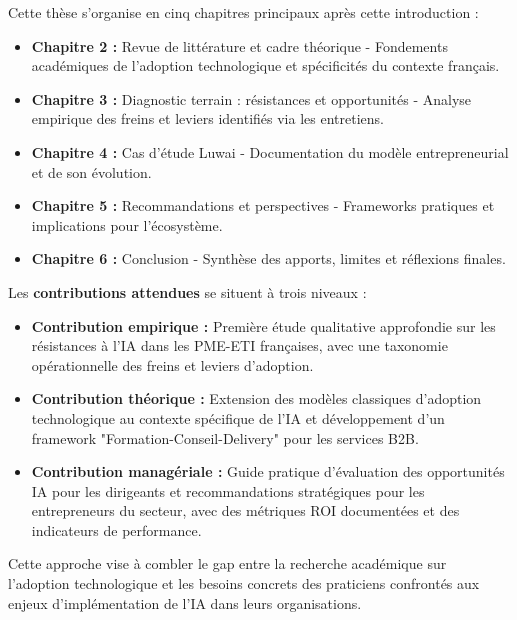 Cette thèse s'organise en cinq chapitres principaux après cette introduction :
\bigskip
\begin{itemize}
    \item \textbf{Chapitre 2 :} Revue de littérature et cadre théorique - Fondements académiques de l'adoption technologique et spécificités du contexte français.
    \item \textbf{Chapitre 3 :} Diagnostic terrain : résistances et opportunités - Analyse empirique des freins et leviers identifiés via les entretiens.
    \item \textbf{Chapitre 4 :} Cas d'étude Luwai - Documentation du modèle entrepreneurial et de son évolution.
    \item \textbf{Chapitre 5 :} Recommandations et perspectives - Frameworks pratiques et implications pour l'écosystème.
    \item \textbf{Chapitre 6 :} Conclusion - Synthèse des apports, limites et réflexions finales.
\end{itemize}
\newpage
Les \textbf{contributions attendues} se situent à trois niveaux :
\bigskip
\begin{itemize}
    \item \textbf{Contribution empirique :} Première étude qualitative approfondie sur les résistances à l'IA dans les PME-ETI françaises, avec une taxonomie opérationnelle des freins et leviers d'adoption.
    \item \textbf{Contribution théorique :} Extension des modèles classiques d'adoption technologique au contexte spécifique de l'IA et développement d'un framework "Formation-Conseil-Delivery" pour les services B2B.
    \item \textbf{Contribution managériale :} Guide pratique d'évaluation des opportunités IA pour les dirigeants et recommandations stratégiques pour les entrepreneurs du secteur, avec des métriques ROI documentées et des indicateurs de performance.
\end{itemize}
\medskip
Cette approche vise à combler le gap entre la recherche académique sur l'adoption technologique et les besoins concrets des praticiens confrontés aux enjeux d'implémentation de l'IA dans leurs organisations.
